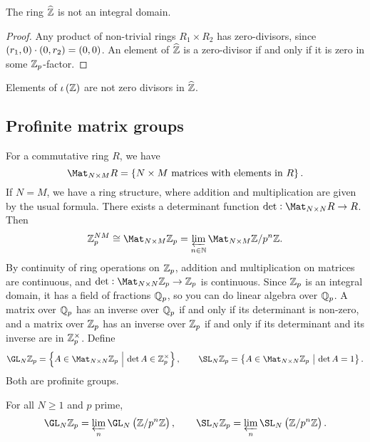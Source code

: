\begin{corollary}
The ring $ \widehat{\mathbb{Z}} $ is not an integral domain.
\end{corollary}

\begin{proof}
Any product of non-trivial rings $ R_1 \times R_2 $ has zero-divisors, since $ \br{r_1, 0} \cdot \br{0, r_2} = \br{0, 0} $. An element of $ \widehat{\mathbb{Z}} $ is a zero-divisor if and only if it is zero in some $ \mathbb{Z}_p $-factor.
\end{proof}

Elements of $ \iota\br{\ZZ} $ are not zero divisors in $ \widehat{\mathbb{Z}} $.

\pagebreak

\subsection{Profinite matrix groups}


For a commutative ring $ R $, we have
$$ \Mat_{N \times M} R = \cbr{N \times M \ \text{matrices with elements in} \ R}. $$
If $ N = M $, we have a ring structure, where addition and multiplication are given by the usual formula. There exists a determinant function $ \det : \Mat_{N \times N} R \to R $. Then
$$ \ZZ_p^{NM} \cong \Mat_{N \times M} \ZZ_p = \varprojlim_{n \in \NN} \Mat_{N \times M} \ZZ / p^n\ZZ. $$
By continuity of ring operations on $ \mathbb{Z}_p $, addition and multiplication on matrices are continuous, and $ \det : \Mat_{N \times N} \ZZ_p \to \ZZ_p $ is continuous. Since $ \mathbb{Z}_p $ is an integral domain, it has a field of fractions $ \mathbb{Q}_p $, so you can do linear algebra over $ \mathbb{Q}_p $. A matrix over $ \mathbb{Q}_p $ has an inverse over $ \mathbb{Q}_p $ if and only if its determinant is non-zero, and a matrix over $ \mathbb{Z}_p $ has an inverse over $ \mathbb{Z}_p $ if and only if its determinant and its inverse are in $ \mathbb{Z}_p^\times $. Define
$$ \GL_N \ZZ_p = \cbr{A \in \Mat_{N \times N} \ZZ_p \st \det A \in \ZZ_p^\times}, \qquad \SL_N \ZZ_p = \cbr{A \in \Mat_{N \times N} \ZZ_p \st \det A = 1}. $$
Both are profinite groups.

\begin{lemma}
For all $ N \ge 1 $ and $ p $ prime,
$$ \GL_N \ZZ_p = \varprojlim_n \GL_N \br{\ZZ / p^n\ZZ}, \qquad \SL_N \ZZ_p = \varprojlim_n \SL_N \br{\ZZ / p^n\ZZ}. $$
\end{lemma}

